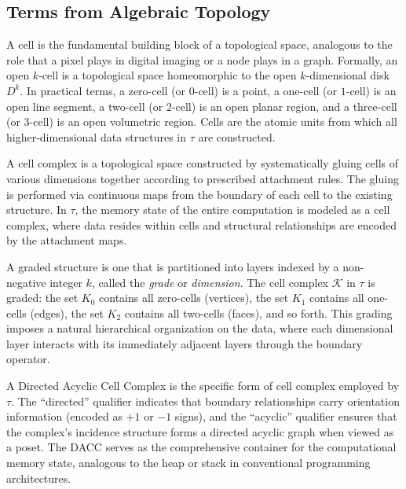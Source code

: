 \documentclass[manuscript, nonacm, review=false]{acmart}
\theoremstyle{definition}
\theoremstyle{plain}
\newcommand{\K}{\mathcal{K}}
\newcommand{\toposLang}{\ensuremath{\tau}\text{-Lang}}
\begin{document}
\subsection{Terms from Algebraic Topology}
\label{subsec:terms_topology}

\begin{description}[style=unboxed, leftmargin=0cm, font=\bfseries]

\item[Cell]
A cell is the fundamental building block of a topological space, analogous to the role that a pixel plays in digital imaging or a node plays in a graph. Formally, an open $k$-cell is a topological space homeomorphic to the open $k$-dimensional disk $D^k$. In practical terms, a zero-cell (or $0$-cell) is a point, a one-cell (or $1$-cell) is an open line segment, a two-cell (or $2$-cell) is an open planar region, and a three-cell (or $3$-cell) is an open volumetric region. Cells are the atomic units from which all higher-dimensional data structures in \toposLang{} are constructed.

\item[Cell Complex]
A cell complex is a topological space constructed by systematically gluing cells of various dimensions together according to prescribed attachment rules. The gluing is performed via continuous maps from the boundary of each cell to the existing structure. In \toposLang{}, the memory state of the entire computation is modeled as a cell complex, where data resides within cells and structural relationships are encoded by the attachment maps.

\item[Graded Structure]
A graded structure is one that is partitioned into layers indexed by a non-negative integer $k$, called the \emph{grade} or \emph{dimension}. The cell complex $\K$ in \toposLang{} is graded: the set $K_0$ contains all zero-cells (vertices), the set $K_1$ contains all one-cells (edges), the set $K_2$ contains all two-cells (faces), and so forth. This grading imposes a natural hierarchical organization on the data, where each dimensional layer interacts with its immediately adjacent layers through the boundary operator.

\item[Directed Acyclic Cell Complex (DACC)]
A Directed Acyclic Cell Complex is the specific form of cell complex employed by \toposLang{}. The ``directed'' qualifier indicates that boundary relationships carry orientation information (encoded as $+1$ or $-1$ signs), and the ``acyclic'' qualifier ensures that the complex's incidence structure forms a directed acyclic graph when viewed as a poset. The DACC serves as the comprehensive container for the computational memory state, analogous to the heap or stack in conventional programming architectures.


\end{description}
\end{document}
